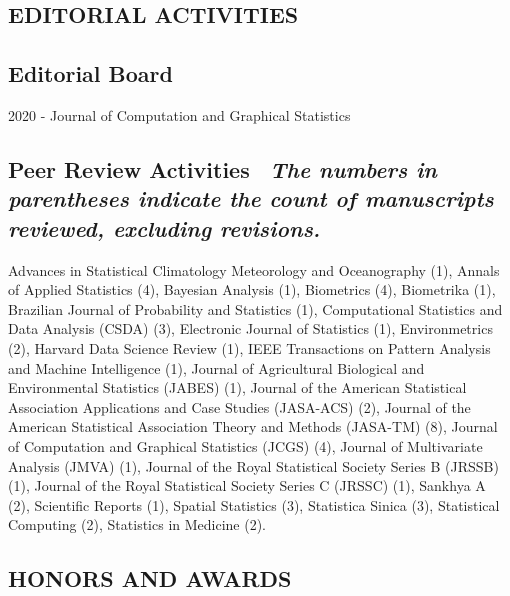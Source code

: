 \documentclass[10pt]{article}
\begin{document}
\subsection*{EDITORIAL ACTIVITIES}

\smallskip

\subsection*{Editorial Board} 2020 - \quad \quad Journal of Computation and Graphical Statistics

\subsection*{Peer Review Activities \ {\small \em  The numbers in parentheses indicate the count of manuscripts reviewed, excluding revisions.}} 
Advances in Statistical Climatology Meteorology and Oceanography (1), Annals of Applied Statistics (4), Bayesian Analysis (1), Biometrics (4), Biometrika (1), Brazilian Journal of Probability and Statistics (1), Computational Statistics and Data Analysis (CSDA) (3), Electronic Journal of Statistics (1), Environmetrics (2), Harvard Data Science Review (1), IEEE Transactions on Pattern Analysis and Machine Intelligence (1), Journal of Agricultural Biological and Environmental Statistics (JABES) (1), Journal of the American Statistical Association Applications and Case Studies (JASA-ACS) (2), Journal of the American Statistical Association Theory and Methods (JASA-TM) (8), Journal of Computation and Graphical Statistics (JCGS) (4), Journal of Multivariate Analysis (JMVA) (1), Journal of the Royal Statistical Society Series B (JRSSB) (1), 
Journal of the Royal Statistical Society Series C (JRSSC) (1), Sankhya A (2), Scientific Reports (1), Spatial Statistics (3), Statistica Sinica (3), Statistical Computing (2), Statistics in Medicine (2).

\subsection*{HONORS AND AWARDS}
\end{document}
